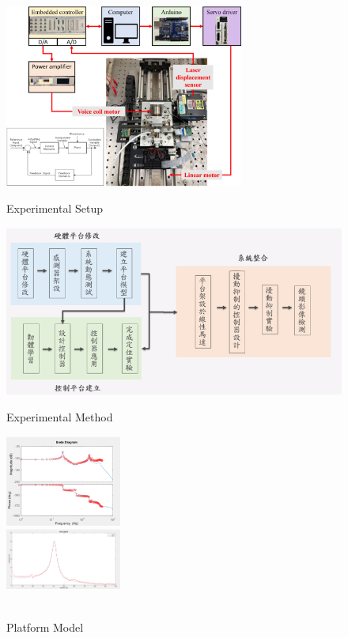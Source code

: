 \documentclass[10pt, letterpaper]{article}
\begin{document}
\begin{figure}[!b]
        \vspace{0.3cm}

        \begin{minipage}[c]{0.33\linewidth}
            \centering
            \includegraphics[width=0.7\textwidth]{fig/Monographic Study/光學檢測平台流程圖.png}
            \caption{Experimental Setup}
        \end{minipage}
        \begin{minipage}[c]{0.33\linewidth}
            \centering
            \includegraphics[width=1.0\textwidth]{fig/Monographic Study/研究方法.png}
            \caption{Experimental Method}
        \end{minipage}
        \begin{minipage}[c]{0.33\linewidth}
            \centering
            \includegraphics[width=3.8cm]{fig/Monographic Study/建立平台模型(主動平台).png} \\
            \includegraphics[width=3.8cm]{fig/Monographic Study/建立平台模型(橡膠軸承).png}
            \caption{\\Platform Model}
        \end{minipage}


\end{figure}
\end{document}
